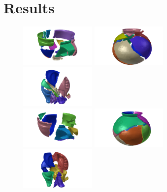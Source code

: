 \documentclass[acmlarge,screen,dvipsnames]{acmart}
\begin{document}
\section{Results}
\begin{figure}[h]
  \includegraphics[width=0.33\textwidth]{images/ambercuppuzzle0}%
  \includegraphics[width=0.33\textwidth]{images/saltdeanpuzzle0}%
  \includegraphics[width=0.33\textwidth]{images/elephantpuzzle0}\\
  \includegraphics[width=0.33\textwidth]{images/ambercuppuzzle2}%
  \includegraphics[width=0.33\textwidth]{images/saltdeanpuzzle1}%
  \includegraphics[width=0.33\textwidth]{images/elephantpuzzle1}\\

\end{figure}
\end{document}
